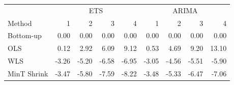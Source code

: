 \documentclass[]{article}
\newenvironment{Shaded}{\begin{snugshade}}{\end{snugshade}}
\newcommand{\KeywordTok}[1]{\textcolor[rgb]{0.13,0.29,0.53}{\textbf{#1}}}
\newcommand{\DataTypeTok}[1]{\textcolor[rgb]{0.13,0.29,0.53}{#1}}
\newcommand{\StringTok}[1]{\textcolor[rgb]{0.31,0.60,0.02}{#1}}
\newcommand{\OperatorTok}[1]{\textcolor[rgb]{0.81,0.36,0.00}{\textbf{#1}}}
\newcommand{\NormalTok}[1]{#1}
\begin{document}
\begin{table}[H]
\centering
\begin{tabular}{l|r|r|r|r|r|r|r|r}
\hline
\multicolumn{1}{c|}{ } & \multicolumn{4}{|c|}{ETS} & \multicolumn{4}{|c}{ARIMA} \\
\cline{2-5} \cline{6-9}
Method & 1 & 2 & 3 & 4 & 1 & 2 & 3 & 4\\
\hline
Bottom-up & 0.00 & 0.00 & 0.00 & 0.00 & 0.00 & 0.00 & 0.00 & 0.00\\
\hline
OLS & 0.12 & 2.92 & 6.09 & 9.12 & 0.53 & 4.69 & 9.20 & 13.10\\
\hline
WLS & -3.26 & -5.20 & -6.58 & -6.95 & -3.05 & -4.56 & -5.51 & -5.90\\
\hline
MinT Shrink & -3.47 & -5.80 & -7.59 & -8.22 & -3.48 & -5.33 & -6.47 & -7.06\\
\hline
\end{tabular}
\end{table}

\begin{Shaded}
\end{Shaded}
\end{document}
